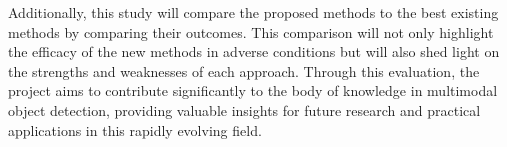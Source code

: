 \documentclass[report.tex]{subfiles}
\begin{document}
    Additionally, this study will compare the proposed methods to the best existing methods by comparing their outcomes. This comparison will not only highlight the efficacy of the new methods in adverse conditions but will also shed light on the strengths and weaknesses of each approach. Through this evaluation, the project aims to contribute significantly to the body of knowledge in multimodal object detection, providing valuable insights for future research and practical applications in this rapidly evolving field.





\end{document}
